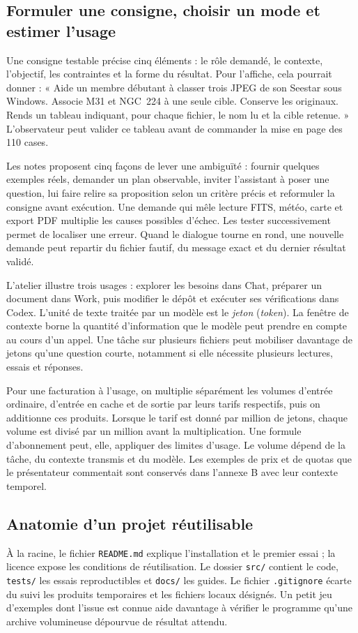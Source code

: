 \subsection{Formuler une consigne, choisir un mode et estimer l'usage}
Une consigne testable précise cinq éléments : le rôle demandé, le contexte, l'objectif, les contraintes et la forme du résultat. Pour l'affiche, cela pourrait donner : « Aide un membre débutant à classer trois JPEG de son Seestar sous Windows. Associe M31 et NGC~224 à une seule cible. Conserve les originaux. Rends un tableau indiquant, pour chaque fichier, le nom lu et la cible retenue. » L'observateur peut valider ce tableau avant de commander la mise en page des 110 cases.

Les notes proposent cinq façons de lever une ambiguïté : fournir quelques exemples réels, demander un plan observable, inviter l'assistant à poser une question, lui faire relire sa proposition selon un critère précis et reformuler la consigne avant exécution. Une demande qui mêle lecture FITS, météo, carte et export PDF multiplie les causes possibles d'échec. Les tester successivement permet de localiser une erreur. Quand le dialogue tourne en rond, une nouvelle demande peut repartir du fichier fautif, du message exact et du dernier résultat validé.

L'atelier illustre trois usages : explorer les besoins dans Chat, préparer un document dans Work, puis modifier le dépôt et exécuter ses vérifications dans Codex. L'unité de texte traitée par un modèle est le \emph{jeton} (\emph{token}). La fenêtre de contexte borne la quantité d'information que le modèle peut prendre en compte au cours d'un appel. Une tâche sur plusieurs fichiers peut mobiliser davantage de jetons qu'une question courte, notamment si elle nécessite plusieurs lectures, essais et réponses.

Pour une facturation à l'usage, on multiplie séparément les volumes d'entrée ordinaire, d'entrée en cache et de sortie par leurs tarifs respectifs, puis on additionne ces produits. Lorsque le tarif est donné par million de jetons, chaque volume est divisé par un million avant la multiplication. Une formule d'abonnement peut, elle, appliquer des limites d'usage. Le volume dépend de la tâche, du contexte transmis et du modèle. Les exemples de prix et de quotas que le présentateur commentait sont conservés dans l'annexe B avec leur contexte temporel.

\subsection{Anatomie d'un projet réutilisable}
À la racine, le fichier \texttt{README.md} explique l'installation et le premier essai ; la licence expose les conditions de réutilisation. Le dossier \texttt{src/} contient le code, \texttt{tests/} les essais reproductibles et \texttt{docs/} les guides. Le fichier \texttt{.gitignore} écarte du suivi les produits temporaires et les fichiers locaux désignés. Un petit jeu d'exemples dont l'issue est connue aide davantage à vérifier le programme qu'une archive volumineuse dépourvue de résultat attendu.

